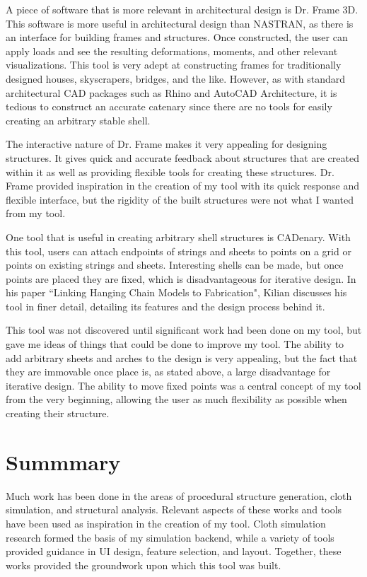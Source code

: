 \documentclass{thesis}
\begin{document}
A piece of software that is more relevant in architectural design is Dr. Frame 3D\cite{drframe}.  This
software is more useful in architectural design than NASTRAN, as there is an interface for building frames
and structures.  Once constructed, the user can apply loads and see the resulting deformations, moments,
and other relevant visualizations.  This tool is very adept at constructing frames for traditionally
designed houses, skyscrapers, bridges, and the like.  However, as with standard architectural CAD packages
such as Rhino\cite{rhino} and AutoCAD Architecture\cite{autocad}, it is tedious to construct an accurate
catenary since there are no tools for easily creating an arbitrary stable shell.

The interactive nature of Dr. Frame makes it very appealing for designing structures.  It gives quick and
accurate feedback about structures that are created within it as well as providing flexible tools for
creating these structures.  Dr. Frame provided inspiration in the creation of my tool with its quick
response and flexible interface, but the rigidity of the built structures were not what I wanted from
my tool.

One tool that is useful in creating arbitrary shell structures is CADenary\cite{cadenary}.  With this tool,
users can attach endpoints of strings and sheets to points on a grid or points on existing strings and sheets.
Interesting shells can be made, but once points are placed they are fixed, which is disadvantageous for
iterative design.  In his paper ``Linking Hanging Chain Models to Fabrication"\cite{kilian05cadenary}, Kilian
discusses his tool in finer detail, detailing its features and the design process behind it.

This tool was not discovered until significant work had been done on my tool, but gave me ideas of things that
could be done to improve my tool.  The ability to add arbitrary sheets and arches to the design is very appealing,
but the fact that they are immovable once place is, as stated above, a large disadvantage for iterative design.
The ability to move fixed points was a central concept of my tool from the very beginning, allowing the user
as much flexibility as possible when creating their structure.

\section{Summmary}
Much work has been done in the areas of procedural structure generation, cloth simulation, and structural analysis.
Relevant aspects of these works and tools have been used as inspiration in the creation of my tool.  Cloth simulation
research formed the basis of my simulation backend, while a variety of tools provided guidance in UI design, feature
selection, and layout.  Together, these works provided the groundwork upon which this tool was built.
\end{document}
